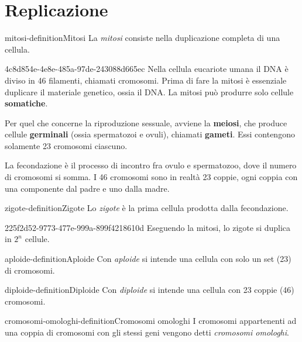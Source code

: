 \documentclass[preview]{standalone}
\begin{document}
\genpage

\section{Replicazione}

\begin{snippetdefinition}{mitosi-definition}{Mitosi}
    La \textit{mitosi} consiste nella duplicazione completa di una cellula.
\end{snippetdefinition}

\begin{snippet}{4c8d854e-4e8e-485a-97de-243088d665ec}
    Nella cellula eucariote umana il DNA è diviso in 46 filamenti, chiamati cromosomi.
    Prima di fare la mitosi è essenziale duplicare il materiale genetico, ossia il DNA.
    La mitosi può produrre solo cellule \textbf{somatiche}.

    Per quel che concerne la riproduzione sessuale,
    avviene la \textbf{meiosi}, che produce cellule \textbf{germinali}
    (ossia spermatozoi e ovuli), chiamati \textbf{gameti}.
    Essi contengono solamente 23 cromosomi ciascuno.

    La fecondazione è il processo di incontro fra ovulo e spermatozoo,
    dove il numero di cromosomi si somma.
    I 46 cromosomi sono in realtà 23 coppie, ogni coppia con una componente dal padre e uno dalla madre.
\end{snippet}

\begin{snippetdefinition}{zigote-definition}{Zigote}
    Lo \textit{zigote} è la prima cellula prodotta dalla fecondazione.
\end{snippetdefinition}

\begin{snippet}{225f2d52-9773-477e-999a-899f4218610d}
    Eseguendo la mitosi, lo zigote si duplica in \(2^n\) cellule.
\end{snippet}

\begin{snippetdefinition}{aploide-definition}{Aploide}
    Con \textit{aploide} si intende una cellula con solo un set (23) di cromosomi.
\end{snippetdefinition}


\begin{snippetdefinition}{diploide-definition}{Diploide}
    Con \textit{diploide} si intende una cellula con 23 coppie (46) cromosomi.
\end{snippetdefinition}


\begin{snippetdefinition}{cromosomi-omologhi-definition}{Cromosomi omologhi}
    I cromosomi appartenenti ad una coppia di cromosomi con gli stessi geni vengono detti
    \textit{cromosomi omologhi}.
\end{snippetdefinition}

\end{document}
